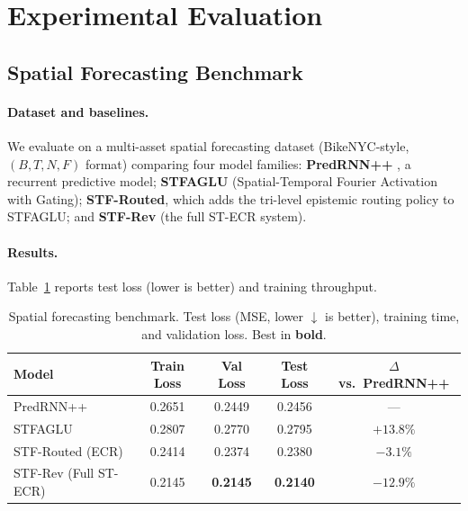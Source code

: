 \documentclass[11pt,a4paper]{article}
\begin{document}
\section{Experimental Evaluation}
\label{sec:experiments}

\subsection{Spatial Forecasting Benchmark}
\label{sec:spatial_bench}

\paragraph{Dataset and baselines.}
We evaluate on a multi-asset spatial forecasting dataset (BikeNYC-style,
$(B, T, N, F)$ format) comparing four model families:
\textbf{PredRNN++} \citep{wang2018predrnn}, a recurrent predictive model;
\textbf{STFAGLU} (Spatial-Temporal Fourier Activation with Gating);
\textbf{STF-Routed}, which adds the tri-level epistemic routing policy to
STFAGLU; and \textbf{STF-Rev} (the full ST-ECR system).

\paragraph{Results.}
Table~\ref{tab:main_results} reports test loss (lower is better) and training
throughput.

\begin{table}[ht]
\centering
\caption{Spatial forecasting benchmark. Test loss (MSE, lower $\downarrow$ is better),
training time, and validation loss. Best in \textbf{bold}.}
\label{tab:main_results}
\setlength{\tabcolsep}{10pt}
\begin{tabular}{lcccc}
\toprule
Model & Train Loss & Val Loss & Test Loss & $\Delta$ vs.\ PredRNN++ \\
\midrule
PredRNN++             & 0.2651 & 0.2449 & 0.2456 & --- \\
STFAGLU               & 0.2807 & 0.2770 & 0.2795 & $+13.8\%$ \\
STF-Routed (ECR)      & 0.2414 & 0.2374 & 0.2380 & $\mathbf{-3.1\%}$ \\
STF-Rev (Full ST-ECR) & 0.2145 & \textbf{0.2145} & \textbf{0.2140} & $\mathbf{-12.9\%}$ \\
\bottomrule
\end{tabular}
\end{table}
\end{document}

